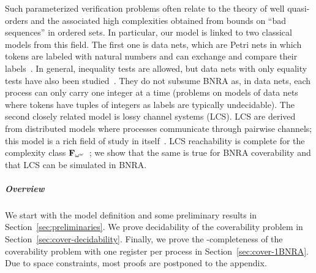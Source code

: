 Such parameterized verification problems often relate to the theory of well quasi-orders
and the associated high complexities obtained from bounds on ``bad sequences'' in ordered sets. In particular, our model is linked to two classical models from this field. The first one is data nets, which are Petri nets in which tokens are labeled with natural numbers and can exchange and compare their labels~\cite{LazicNORW08}. In general, inequality tests are allowed, but data nets with only equality tests have also been studied~\cite{Rosa-Velardo17}. They do not subsume BNRA as, in data nets, each process can only carry one integer at a time (problems on models of data nets where tokens have tuples of integers as labels are typically undecidable).
The second closely related model is lossy channel systems (LCS)\cite{AbdullaJ1996verif}. LCS are derived from distributed models where processes communicate through pairwise channels; this model is a rich field of study in itself~\cite{Aiswarya2015model,Aiswarya2020networks}. LCS reachability is complete for the complexity class $\mathbf{F}_{\omega^\omega}$~\cite{ChambartS08ordinal, Schnoebelen2002verifying}; we show that the same is true for BNRA coverability and that LCS can be simulated in BNRA.

\subparagraph*{Overview}
We start with the model definition and some preliminary results in Section~\ref{sec:preliminaries}. We prove decidability of the coverability problem in Section~\ref{sec:cover-decidability}. 
Finally, we prove the \NP-completeness of the coverability problem with one register per process in Section~\ref{sec:cover-1BNRA}.
Due to space constraints, most proofs are postponed to the appendix.

